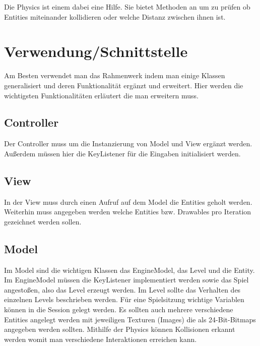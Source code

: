 \documentclass[a4paper, 11pt]{article}
\begin{document}
Die Physics ist einem dabei eine Hilfe. Sie bietet Methoden an um zu prüfen ob Entities miteinander kollidieren oder welche Distanz zwischen ihnen ist.  

\section{Verwendung/Schnittstelle}

Am Besten verwendet man das Rahmenwerk indem man einige Klassen generalisiert und deren Funktionalität ergänzt und erweitert. Hier werden die wichtigsten Funktionalitäten erläutert die man erweitern muss.

\subsection{Controller}

Der Controller muss um die Instanzierung von Model und View ergänzt werden. Außerdem müssen hier die KeyListener für die Eingaben initialisiert werden.

\subsection{View}

In der View muss durch einen Aufruf auf dem Model die Entities geholt werden. Weiterhin muss angegeben werden welche Entities bzw. Drawables pro Iteration gezeichnet werden sollen.

\subsection{Model}

Im Model sind die wichtigen Klassen das EngineModel, das Level und die Entity. Im EngineModel müssen die KeyListener implementiert werden sowie das Spiel angestoßen, also das Level erzeugt werden. Im Level sollte das Verhalten des einzelnen Levels beschrieben werden. Für eine Spielsitzung wichtige Variablen können in die Session gelegt werden. Es sollten auch mehrere verschiedene Entities angelegt werden mit jeweiligen Texturen (Images) die als 24-Bit-Bitmaps angegeben werden sollten. Mithilfe der Physics können Kollisionen erkannt werden womit man verschiedene Interaktionen erreichen kann. 
\end{document}
